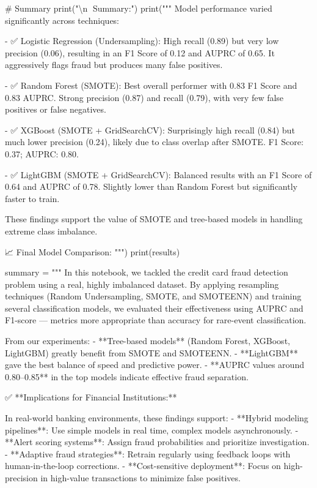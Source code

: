 \documentclass[
  letterpaper,
  DIV=11,
  numbers=noendperiod]{scrartcl}
\newenvironment{Shaded}{\begin{snugshade}}{\end{snugshade}}
\newcommand{\BuiltInTok}[1]{\textcolor[rgb]{0.00,0.23,0.31}{#1}}
\newcommand{\CharTok}[1]{\textcolor[rgb]{0.13,0.47,0.30}{#1}}
\newcommand{\CommentTok}[1]{\textcolor[rgb]{0.37,0.37,0.37}{#1}}
\newcommand{\NormalTok}[1]{\textcolor[rgb]{0.00,0.23,0.31}{#1}}
\newcommand{\OperatorTok}[1]{\textcolor[rgb]{0.37,0.37,0.37}{#1}}
\newcommand{\StringTok}[1]{\textcolor[rgb]{0.13,0.47,0.30}{#1}}
\begin{document}
\begin{Shaded}
\begin{Highlighting}[]
    \CommentTok{\# Summary}
    \BuiltInTok{print}\NormalTok{(}\StringTok{"}\CharTok{\textbackslash{}n}\StringTok{📌 Summary:"}\NormalTok{)}
    \BuiltInTok{print}\NormalTok{(}\StringTok{"""}
\StringTok{Model performance varied significantly across techniques:}

\StringTok{{-} ✅ Logistic Regression (Undersampling): High recall (0.89) but very low precision (0.06), resulting in an F1 Score of 0.12 and AUPRC of 0.65. It aggressively flags fraud but produces many false positives.}

\StringTok{{-} ✅ Random Forest (SMOTE): Best overall performer with 0.83 F1 Score and 0.83 AUPRC. Strong precision (0.87) and recall (0.79), with very few false positives or false negatives.}

\StringTok{{-} ✅ XGBoost (SMOTE + GridSearchCV): Surprisingly high recall (0.84) but much lower precision (0.24), likely due to class overlap after SMOTE. F1 Score: 0.37; AUPRC: 0.80.}

\StringTok{{-} ✅ LightGBM (SMOTE + GridSearchCV): Balanced results with an F1 Score of 0.64 and AUPRC of 0.78. Slightly lower than Random Forest but significantly faster to train.}

\StringTok{These findings support the value of SMOTE and tree{-}based models in handling extreme class imbalance.}

\StringTok{📈 Final Model Comparison:}
\StringTok{"""}\NormalTok{)}
    \BuiltInTok{print}\NormalTok{(results)}

\NormalTok{    summary }\OperatorTok{=} \StringTok{"""}
\StringTok{In this notebook, we tackled the credit card fraud detection problem using a real, highly imbalanced dataset. By applying resampling techniques (Random Undersampling, SMOTE, and SMOTEENN) and training several classification models, we evaluated their effectiveness using AUPRC and F1{-}score — metrics more appropriate than accuracy for rare{-}event classification.}

\StringTok{From our experiments:}
\StringTok{{-} **Tree{-}based models** (Random Forest, XGBoost, LightGBM) greatly benefit from SMOTE and SMOTEENN.}
\StringTok{{-} **LightGBM** gave the best balance of speed and predictive power.}
\StringTok{{-} **AUPRC values around 0.80–0.85** in the top models indicate effective fraud separation.}

\StringTok{✅ **Implications for Financial Institutions:**}

\StringTok{In real{-}world banking environments, these findings support:}
\StringTok{{-} **Hybrid modeling pipelines**: Use simple models in real time, complex models asynchronously.}
\StringTok{{-} **Alert scoring systems**: Assign fraud probabilities and prioritize investigation.}
\StringTok{{-} **Adaptive fraud strategies**: Retrain regularly using feedback loops with human{-}in{-}the{-}loop corrections.}
\StringTok{{-} **Cost{-}sensitive deployment**: Focus on high{-}precision in high{-}value transactions to minimize false positives.}


\end{Highlighting}
\end{Shaded}
\end{document}
